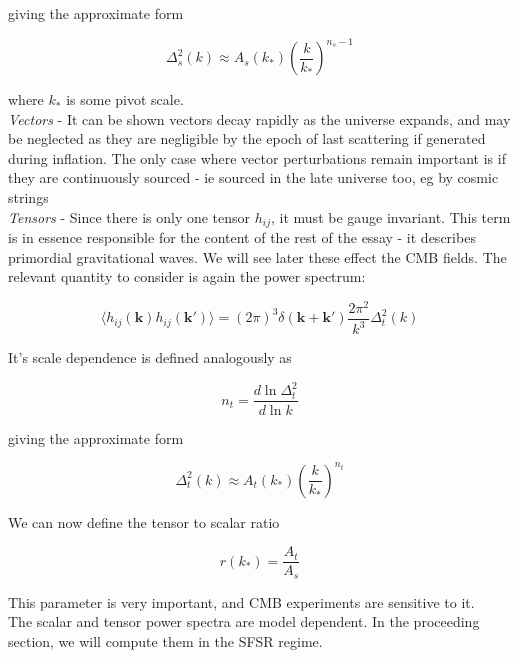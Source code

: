 \documentclass[a4paper,10pt]{article}
\renewcommand{\v}[1]{\mathbf{#1}}
\begin{document}
giving the approximate form 

\begin{equation}
\Delta^2_s(k) \approx A_s(k_*)(\frac{k}{k_*})^{n_s-1} 
\end{equation}

where $k_*$ is some pivot scale. \\



\textit{Vectors} - It can be shown vectors decay rapidly as the universe expands, and may be neglected as they are negligible by the epoch of last scattering if generated during inflation. The only case where vector perturbations remain important is if they are continuously sourced - ie sourced in the late universe too, eg by cosmic strings\\

\textit{Tensors} - Since there is only one tensor $h_{ij}$, it must be gauge invariant. This term is in essence responsible for the content of the rest of the essay - it describes primordial gravitational waves. We will see later these effect the CMB fields. The relevant quantity to consider is again the power spectrum:

\begin{equation}
\langle h_{ij}(\v{k})h_{ij}(\v{k'}) \rangle=(2\pi)^3\delta(\v{k}+\v{k'})\frac{2\pi^2}{k^3}\Delta^2_t(k)
\end{equation}

It's scale dependence is defined analogously as 

\begin{equation}
n_t = \frac{d\ln{\Delta^2_t}}{d\ln{k}}
\end{equation}

giving the approximate form 

\begin{equation}
\Delta^2_t(k) \approx A_t(k_*)(\frac{k}{k_*})^{n_t}
\end{equation}

We can now define the tensor to scalar ratio

\begin{equation}
r(k_*)=\frac{A_t}{A_s} 
\end{equation}

This parameter is very important, and CMB experiments are sensitive to it. \\

The scalar and tensor power spectra are model dependent. In the proceeding section, we will compute them in the SFSR regime.
\end{document}
